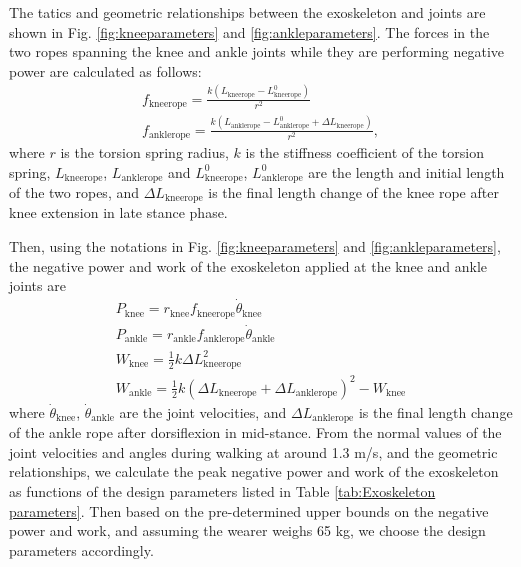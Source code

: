 \documentclass[twocolumn,cleanfoot,10pt]{asme2ej}
\begin{document}

The tatics and geometric relationships between the exoskeleton and joints are shown in Fig. \ref{fig:kneeparameters} and \ref{fig:ankleparameters}.
The forces in the two ropes spanning the knee and ankle joints while they are performing negative power are calculated as follows:
\begin{gather}
	f_\mathrm{kneerope} = \frac{k(L_\mathrm{kneerope}-L_\mathrm{kneerope}^0)}{r^2} \\
	f_\mathrm{anklerope} = \frac{k(L_\mathrm{anklerope}-L_\mathrm{anklerope}^0+\Delta L_\mathrm{kneerope})}{r^2},
\end{gather}
where $r$ is the torsion spring radius, $k$ is the stiffness coefficient of the torsion spring, $L_\mathrm{kneerope}$, $L_\mathrm{anklerope}$ and $L_\mathrm{kneerope}^0$, $L_\mathrm{anklerope}^0$ are the length and initial length of the two ropes, and $\Delta L_\mathrm{kneerope}$ is the final length change of the knee rope after knee extension in late stance phase.

Then, using the notations in Fig. \ref{fig:kneeparameters} and \ref{fig:ankleparameters}, the negative power and work of the exoskeleton applied at the knee and ankle joints are
\begin{gather}
	P_\mathrm{knee} = r_\mathrm{knee}f_\mathrm{kneerope}\dot{\theta}_\mathrm{knee} \\
	P_\mathrm{ankle} = r_\mathrm{ankle}f_\mathrm{anklerope}\dot{\theta}_\mathrm{ankle} \\
	W_\mathrm{knee} = \frac{1}{2}k\Delta L_\mathrm{kneerope}^2 \\
	W_\mathrm{ankle} = \frac{1}{2}k(\Delta L_\mathrm{kneerope}+\Delta L_\mathrm{anklerope})^2 - W_\mathrm{knee}
\end{gather}
where $\dot{\theta}_\mathrm{knee}$, $\dot{\theta}_\mathrm{ankle}$ are the joint velocities, and $\Delta L_\mathrm{anklerope}$ is the final length change of the ankle rope after dorsiflexion in mid-stance.
From the normal values of the joint velocities and angles during walking at around 1.3 m/s, and the geometric relationships, we calculate the peak negative power and work of the exoskeleton as functions of the design parameters listed in Table \ref{tab:Exoskeleton parameters}.
Then based on the pre-determined upper bounds on the negative power and work, and assuming the wearer weighs 65 kg, we choose the design parameters accordingly.
\end{document}
